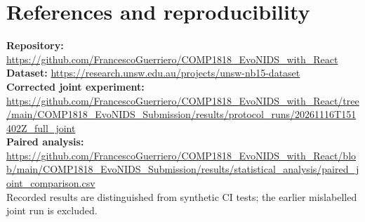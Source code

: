 \documentclass[10pt,a4paper,twocolumn]{extarticle}
\begin{document}
\clearpage
\onecolumn
\section*{References and reproducibility}
\nocite{*}
\printbibliography[heading=none]
\vspace{5pt}
\noindent\textbf{Repository:} \url{https://github.com/FrancescoGuerriero/COMP1818_EvoNIDS_with_React}\\
\textbf{Dataset:} \url{https://research.unsw.edu.au/projects/unsw-nb15-dataset}\\
\textbf{Corrected joint experiment:} \url{https://github.com/FrancescoGuerriero/COMP1818_EvoNIDS_with_React/tree/main/COMP1818_EvoNIDS_Submission/results/protocol_runs/20261116T151402Z_full_joint}\\
\textbf{Paired analysis:} \url{https://github.com/FrancescoGuerriero/COMP1818_EvoNIDS_with_React/blob/main/COMP1818_EvoNIDS_Submission/results/statistical_analysis/paired_joint_comparison.csv}\\
\footnotesize Recorded results are distinguished from synthetic CI tests; the earlier mislabelled joint run is excluded.
\end{document}

